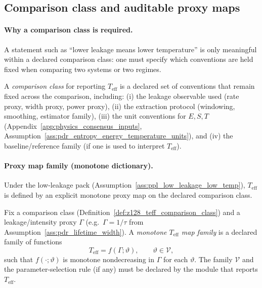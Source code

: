 \subsection{Comparison class and auditable proxy maps}
\label{subsec:teff_comparison_class}

\paragraph{Why a comparison class is required.}
\AuditTag A statement such as ``lower leakage means lower temperature'' is only meaningful within a declared comparison class: one must specify which conventions are held fixed when comparing two systems or two regimes.

\begin{definition}\label{def:z128_teff_comparison_class}
\MatchTag A \emph{comparison class} for reporting $T_{\mathrm{eff}}$ is a declared set of conventions that remain fixed across the comparison, including:
(i) the leakage observable used (rate proxy, width proxy, power proxy),
(ii) the extraction protocol (windowing, smoothing, estimator family),
(iii) the unit conventions for $E,S,T$ (Appendix~\ref{app:physics_consensus_inputs}, Assumption~\ref{ass:pdr_entropy_energy_temperature_units}),
and (iv) the baseline/reference family (if one is used to interpret $T_{\mathrm{eff}}$).
\end{definition}

\paragraph{Proxy map family (monotone dictionary).}
\MatchTag Under the low-leakage pack (Assumption~\ref{ass:ppl_low_leakage_low_temp}), $T_{\mathrm{eff}}$ is defined by an explicit monotone proxy map on the declared comparison class.

\begin{definition}\label{def:z128_teff_proxy_map_family}
\MatchTag Fix a comparison class (Definition~\ref{def:z128_teff_comparison_class}) and a leakage/intensity proxy $\Gamma$ (e.g.\ $\Gamma=1/\tau$ from Assumption~\ref{ass:pdr_lifetime_width}).
A \emph{monotone $T_{\mathrm{eff}}$ map family} is a declared family of functions
\[
T_{\mathrm{eff}}=f(\Gamma;\vartheta),
\qquad
\vartheta\in\mathcal{V},
\]
such that $f(\cdot;\vartheta)$ is monotone nondecreasing in $\Gamma$ for each $\vartheta$.
The family $\mathcal{V}$ and the parameter-selection rule (if any) must be declared by the module that reports $T_{\mathrm{eff}}$.
\end{definition}

